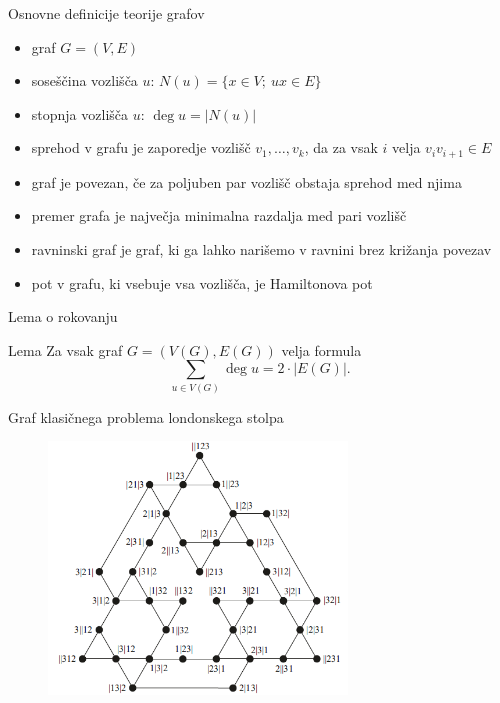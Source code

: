 \documentclass{beamer}
\newcommand{\graf}[1][G]{\ensuremath{#1 = (V(#1), E(#1))}}
\DeclareMathOperator {\stopnja} {deg}
\begin{document}
\begin{frame}{Osnovne definicije teorije grafov}
    \begin{itemize}
        \item graf $ G = (V, E) $
        \item \alert{soseščina} vozlišča $u$: $N(u) = \{x \in V;\ ux \in E\}$
        \item \alert{stopnja} vozlišča $u$: $\stopnja u  = \lvert N(u) \rvert$
        \item \alert{sprehod} v grafu je zaporedje vozlišč $v_1,\ldots, v_k$, da za vsak $i$ velja $v_i v_{i+1} \in E$
        \item graf je \alert{povezan}, če za poljuben par vozlišč obstaja sprehod med njima
        \item \alert{premer} grafa je največja minimalna razdalja med pari vozlišč
    \end{itemize}
\end{frame}

\begin{frame}
    \begin{itemize}
        \item \alert{ravninski} graf je graf, ki ga lahko narišemo v ravnini brez križanja povezav
        \item pot v grafu, ki vsebuje vsa vozlišča, je \alert{Hamiltonova pot}
    \end{itemize}
\end{frame}

\begin{frame}{Lema o rokovanju}
	\begin{block}{Lema}
		Za vsak graf $\graf$ velja formula
		\begin{equation}
		\sum_{u \in V(G)}\! \stopnja u = 2 \cdot |E(G)|.
		\label{eq:lema-o-rokovanju}
		\end{equation}
	\end{block}
\end{frame}

\begin{frame}{Graf klasičnega problema londonskega stolpa}
    
    \begin{figure}
        \centering
        \includegraphics[height=190pt]{../img/tolgraph.png}
    \end{figure}
\end{frame}
\end{document}
